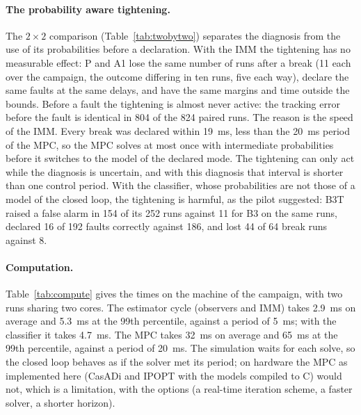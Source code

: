 \documentclass[10pt]{article}
\begin{document}


\paragraph{The probability aware tightening.} The $2\times2$ comparison (Table~\ref{tab:twobytwo}) separates the diagnosis from the use of its probabilities before a declaration. With the IMM the tightening has no measurable effect: P and A1 lose the same number of runs after a break (11 each over the campaign, the outcome differing in ten runs, five each way), declare the same faults at the same delays, and have the same margins and time outside the bounds. Before a fault the tightening is almost never active: the tracking error before the fault is identical in 804 of the 824 paired runs. The reason is the speed of the IMM. Every break was declared within 19~ms, less than the 20~ms period of the MPC, so the MPC solves at most once with intermediate probabilities before it switches to the model of the declared mode. The tightening can only act while the diagnosis is uncertain, and with this diagnosis that interval is shorter than one control period. With the classifier, whose probabilities are not those of a model of the closed loop, the tightening is harmful, as the pilot suggested: B3T raised a false alarm in 154 of its 252 runs against 11 for B3 on the same runs, declared 16 of 192 faults correctly against 186, and lost 44 of 64 break runs against 8.



\paragraph{Computation.} Table~\ref{tab:compute} gives the times on the machine of the campaign, with two runs sharing two cores. The estimator cycle (observers and IMM) takes 2.9~ms on average and 5.3~ms at the 99th percentile, against a period of 5~ms; with the classifier it takes 4.7~ms. The MPC takes 32~ms on average and 65~ms at the 99th percentile, against a period of 20~ms. The simulation waits for each solve, so the closed loop behaves as if the solver met its period; on hardware the MPC as implemented here (CasADi and IPOPT with the models compiled to C) would not, which is a limitation, with the options (a real-time iteration scheme, a faster solver, a shorter horizon).
\end{document}
